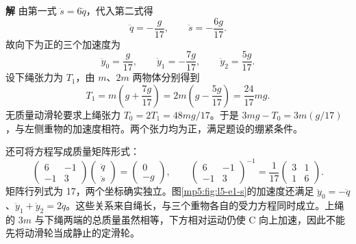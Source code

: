 \documentclass[11pt,openany,fontset=fandol]{ctexbook}
\theoremstyle{definition}\newtheorem{example}{例}[chapter]\newtheorem{exercise}{习题}[chapter]
\newcommand{\SolutionStart}{\par\medskip\ifdim\pagetotal>0pt\ifdim\dimexpr\pagegoal-\pagetotal\relax<3\baselineskip\newpage\fi\fi\noindent\textbf{解}\quad\ignorespaces}
\newenvironment{solution}{\SolutionStart}{\par\medskip}
\begin{document}
\begin{solution}
由第一式 $\ddot s=6\ddot q$，代入第二式得
\[
\ddot q=-\frac g{17},\qquad\ddot s=-\frac{6g}{17}.
\]
故向下为正的三个加速度为
\[
\boxed{\ddot y_0=\frac g{17},\qquad
\ddot y_1=-\frac{7g}{17},\qquad
\ddot y_2=\frac{5g}{17}.}
\]
设下绳张力为 $T_1$，由 $m$、$2m$ 两物体分别得到
\[
T_1=m\left(g+\frac{7g}{17}\right)
=2m\left(g-\frac{5g}{17}\right)=\frac{24}{17}mg.
\]
无质量动滑轮要求上绳张力 $T_0=2T_1=48mg/17$。于是 $3mg-T_0=3m(g/17)$，与左侧重物的加速度相符。两个张力均为正，满足题设的绷紧条件。

还可将方程写成质量矩阵形式：
\[
\begin{pmatrix}6&-1\\-1&3\end{pmatrix}
\begin{pmatrix}\ddot q\\\ddot s\end{pmatrix}
=\begin{pmatrix}0\\-g\end{pmatrix},\qquad
\begin{pmatrix}6&-1\\-1&3\end{pmatrix}^{-1}
=\frac1{17}\begin{pmatrix}3&1\\1&6\end{pmatrix}.
\]
矩阵行列式为 17，两个坐标确实独立。图\ref{mp5:fig:l5-e1-s}的加速度还满足 $\ddot y_0=-\ddot q$、$\ddot y_1+\ddot y_2=2\ddot q$。这些关系来自绳长，与三个重物各自的受力方程同时成立。上绳的 $3m$ 与下绳两端的总质量虽然相等，下方相对运动仍使 C 向上加速，因此不能先将动滑轮当成静止的定滑轮。

\end{solution}
\end{document}

